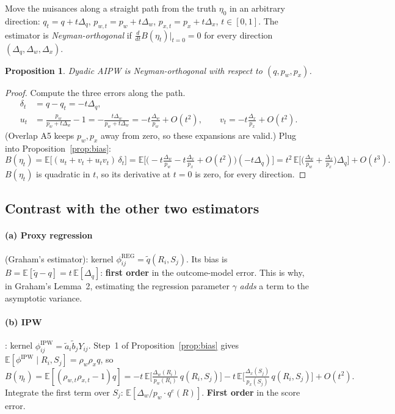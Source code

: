 \documentclass[11pt,a4paper]{article}
\newtheorem{proposition}{Proposition}
\theoremstyle{remark}
\newcommand{\E}{\mathbb{E}}
\newcommand{\1}{\mathbf{1}}
\newcommand{\qe}{q^{e}}
\begin{document}
\begin{setupbox}
Move the nuisances along a straight path from the truth $\eta_0$ in an arbitrary direction:
$q_t=q+t\Delta_q$, $p_{w,t}=p_w+t\Delta_w$, $p_{x,t}=p_x+t\Delta_x$, $t\in[0,1]$.
The estimator is \emph{Neyman-orthogonal} if
$\displaystyle \frac{d}{dt}B(\eta_t)\Big|_{t=0}=0$ for every direction $(\Delta_q,\Delta_w,\Delta_x)$.
\end{setupbox}

\begin{proposition}\label{prop:orth}
Dyadic AIPW is Neyman-orthogonal with respect to $(q,p_w,p_x)$.
\end{proposition}

\begin{proof}
Compute the three errors along the path.
\begin{align*}
\delta_t&=q-q_t=-t\Delta_q,\\
u_t&=\frac{p_w}{p_w+t\Delta_w}-1=-\frac{t\Delta_w}{p_w+t\Delta_w}=-t\frac{\Delta_w}{p_w}+O(t^2),
\qquad v_t=-t\frac{\Delta_x}{p_x}+O(t^2).
\end{align*}
(Overlap A5 keeps $p_w,p_x$ away from zero, so these expansions are valid.) Plug into Proposition~\ref{prop:bias}:
\[
B(\eta_t)=\E\big[(u_t+v_t+u_tv_t)\,\delta_t\big]
=\E\Big[\Big(-t\tfrac{\Delta_w}{p_w}-t\tfrac{\Delta_x}{p_x}+O(t^2)\Big)(-t\Delta_q)\Big]
=t^2\,\E\Big[\Big(\tfrac{\Delta_w}{p_w}+\tfrac{\Delta_x}{p_x}\Big)\Delta_q\Big]+O(t^3).
\]
$B(\eta_t)$ is quadratic in $t$, so its derivative at $t=0$ is zero, for every direction.
\end{proof}

\subsection{Contrast with the other two estimators}

\paragraph{(a) Proxy regression} (Graham's estimator): kernel $\phi^{\mathrm{REG}}_{ij}=\tilde q(R_i,S_j)$. Its bias is
$B=\E[\tilde q-q]=t\,\E[\Delta_q]$: \textbf{first order} in the outcome-model error. This is why, in Graham's Lemma~2, estimating the regression parameter $\gamma$ \emph{adds} a term to the asymptotic variance.

\paragraph{(b) IPW}: kernel $\phi^{\mathrm{IPW}}_{ij}=\tilde a_i\tilde b_jY_{ij}$. Step~1 of Proposition~\ref{prop:bias} gives $\E[\phi^{\mathrm{IPW}}\mid R_i,S_j]=\rho_w\rho_x q$, so
\[
B(\eta_t)=\E[(\rho_{w,t}\rho_{x,t}-1)q]=-t\,\E\Big[\tfrac{\Delta_w(R_i)}{p_w(R_i)}\,q(R_i,S_j)\Big]-t\,\E\Big[\tfrac{\Delta_x(S_j)}{p_x(S_j)}\,q(R_i,S_j)\Big]+O(t^2).
\]
Integrate the first term over $S_j$: $\E[\Delta_w/p_w\cdot \qe(R)]$. \textbf{First order} in the score error.
\end{document}
